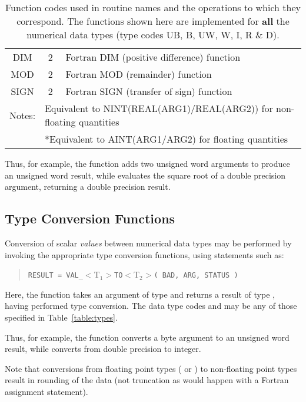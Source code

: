 \begin{table}
\begin{center}
\begin{tabular}{|c|c|l|}
DIM & 2 & Fortran DIM (positive difference) function \\
MOD & 2 & Fortran MOD (remainder) function \\
SIGN & 2 & Fortran SIGN (transfer of sign) function \\
\hline
\multicolumn{1}{|r}{\footnotesize Notes:} &
\multicolumn{2}{l|}{\footnotesize *Equivalent to
NINT(REAL(ARG1)$/$REAL(ARG2)) for non-floating quantities} \\ 
\multicolumn{1}{|l}{} &
\multicolumn{2}{l|}{\footnotesize **Equivalent to AINT(ARG1$/$ARG2) for
floating quantities} \\ 
\hline
\end{tabular}
\caption{Function codes used in routine names and the operations to which they
correspond. 
The functions shown here are implemented for {\bf all} the numerical data 
types (type codes UB, B, UW, W, I, R \& D).}
\label{table:functions}
\end{center}
\end{table}

Thus, for example, the function  adds two unsigned word
arguments to produce an unsigned word result, while 
evaluates the square root of a double precision argument, returning a double
precision result. 

\subsection{ Type Conversion Functions}

Conversion of scalar {\em values} between numerical data types may be
performed by invoking the appropriate  type conversion functions,
using statements such as: 

\begin{quote}
\verb#RESULT = VAL_#$<$T$_{1}>$\verb#TO#$<$T$_{2}>$\verb#( BAD, ARG, STATUS )#
\end{quote}

Here, the  function takes an argument of type 
and returns a result of type , having performed type
conversion. 
The data type codes  and  may be any of
those specified in Table~\ref{table:types}. 

Thus, for example, the function  converts a byte argument
to an unsigned word result, while  converts from double
precision to integer. 

Note that conversions from floating point types ( or
) to non-floating point types result in rounding of the data
(not truncation as would happen with a Fortran assignment statement). 

